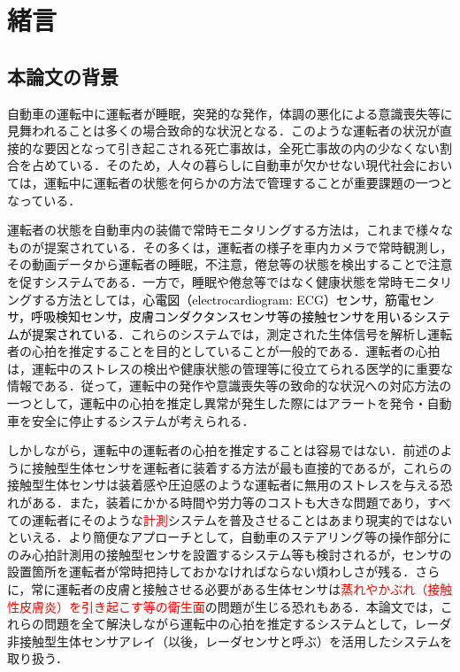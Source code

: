 \chapter{緒言}
\label{chap:intro}

\section{本論文の背景}
自動車の運転中に運転者が睡眠，突発的な発作，体調の悪化による意識喪失等に見舞われることは多くの場合致命的な状況となる．このような運転者の状況が直接的な要因となって引き起こされる死亡事故は，全死亡事故の内の少なくない割合を占めている．そのため，人々の暮らしに自動車が欠かせない現代社会においては，運転中に運転者の状態を何らかの方法で管理することが重要課題の一つとなっている．

運転者の状態を自動車内の装備で常時モニタリングする方法は，これまで様々なものが提案されている\cite{sensorreview}．その多くは，運転者の様子を車内カメラで常時観測し，その動画データから運転者の睡眠，不注意，倦怠等の状態を検出することで注意を促すシステムである\cite{system1, system2, system3}．一方で，睡眠や倦怠等ではなく健康状態を常時モニタリングする方法としては，\textcolor{black}{心電図（electrocardiogram: ECG）センサ，筋電センサ，呼吸検知センサ，皮膚コンダクタンスセンサ等の接触センサを用いるシステムが提案されている}\cite{contactsensor1, contactsensor2}．これらのシステムでは，測定された生体信号を解析し運転者の心拍を推定することを目的としていることが一般的である．運転者の心拍は，運転中のストレスの検出や健康状態の管理等に役立てられる医学的に重要な情報である．従って，運転中の発作や意識喪失等の致命的な状況への対応方法の一つとして，運転中の心拍を推定し異常が発生した際にはアラートを発令・自動車を安全に停止するシステムが考えられる．

しかしながら，運転中の運転者の心拍を推定することは容易ではない．前述のように接触型生体センサを運転者に装着する方法が最も直接的であるが，これらの接触型生体センサは装着感や圧迫感のような運転者に無用のストレスを与える恐れがある．また，装着にかかる時間や労力等のコストも大きな問題であり，すべての運転者にそのような\textcolor{red}{計測}システムを普及させることはあまり現実的ではないといえる．より簡便なアプローチとして，自動車のステアリング等の操作部分にのみ心拍計測用の接触型センサを設置するシステム\cite{eazyap1, eazyap2, eazyap3}等も検討されるが，センサの設置箇所を運転者が常時把持しておかなければならない煩わしさが残る．さらに，常に運転者の皮膚と接触させる必要がある生体センサは\textcolor{red}{蒸れやかぶれ（接触性皮膚炎）を引き起こす等の衛生面}の問題が生じる恐れもある．本論文では，これらの問題を全て解決しながら運転中の心拍を推定するシステムとして，レーダ非接触型生体センサアレイ（以後，レーダセンサと呼ぶ）を活用したシステムを取り扱う．

